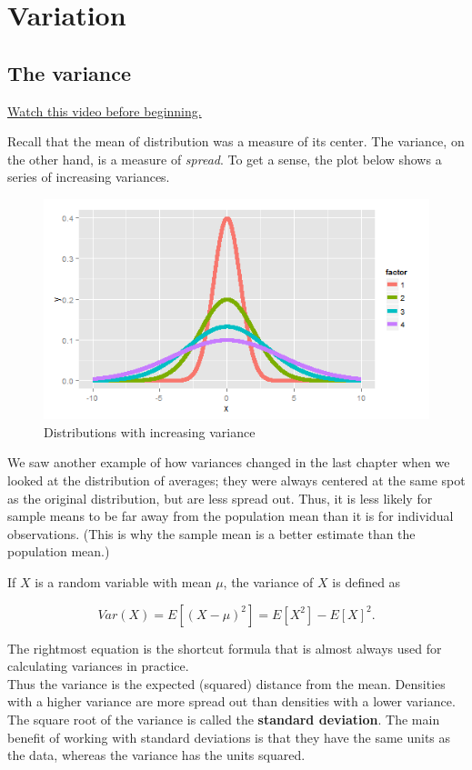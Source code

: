\documentclass[]{article}
\begin{document}
\newpage

\section{Variation}\label{variation}

\subsection{The variance}\label{the-variance}

\href{http://youtu.be/oLQVU-VRiHo?list=PLpl-gQkQivXiBmGyzLrUjzsblmQsLtkzJ}{Watch
this video before beginning.}

Recall that the mean of distribution was a measure of its center. The
variance, on the other hand, is a measure of \emph{spread}. To get a
sense, the plot below shows a series of increasing variances.

\begin{figure}[htbp]
\centering
\includegraphics{LeanPub/images/normalVariances2-1.png}
\caption{Distributions with increasing variance}
\end{figure}

We saw another example of how variances changed in the last chapter when
we looked at the distribution of averages; they were always centered at
the same spot as the original distribution, but are less spread out.
Thus, it is less likely for sample means to be far away from the
population mean than it is for individual observations. (This is why the
sample mean is a better estimate than the population mean.)

If $X$ is a random variable with mean $\mu$, the variance of $X$ is
defined as

\[
Var(X) = E[(X - \mu)^2] = E[X^2] - E[X]^2.
\]

The rightmost equation is the shortcut formula that is almost always
used for calculating variances in practice.\\Thus the variance is the
expected (squared) distance from the mean. Densities with a higher
variance are more spread out than densities with a lower variance. The
square root of the variance is called the \textbf{standard deviation}.
The main benefit of working with standard deviations is that they have
the same units as the data, whereas the variance has the units squared.
\end{document}

